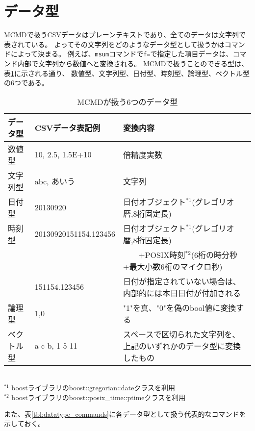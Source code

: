 
%

\section{データ型\label{sect:datatype}}
MCMDで扱うCSVデータはプレーンテキストであり、全てのデータは文字列で表されている。
よってその文字列をどのようなデータ型として扱うかはコマンドによって決まる。
例えば、\verb|msum|コマンドで\verb|f=|で指定した項目データは、コマンド内部で文字列から数値へと変換される。
MCMDで扱うことのできる型は、表\ref{tbl:datatype_types}に示される通り、
数値型、文字列型、日付型、時刻型、論理型、ベクトル型の6つである。

\begin{table}[!hb]
\begin{center}
\caption{MCMDが扱う6つのデータ型\label{tbl:datatype_types}}
{\small
  \begin{tabular}{l|l|l} \hline
データ型  & CSVデータ表記例        & 変換内容 \\ \hline
数値型    & 10, 2.5, 1.5E+10       & 倍精度実数 \\
文字列型  & abc, あいう            & 文字列 \\
日付型    & 20130920               & 日付オブジェクト$^{*1}$(グレゴリオ暦,8桁固定長) \\
時刻型    & 20130920151154.123456  & 日付オブジェクト$^{*1}$(グレゴリオ暦,8桁固定長) \\
          &                        & \ \ \ \ +POSIX時刻$^{*2}$(6桁の時分秒+最大小数6桁のマイクロ秒) \\
          & 151154.123456          & 日付が指定されていない場合は、内部的には本日日付が付加される \\
論理型    & 1,0                    & "1"を真、"0"を偽のbool値に変換する \\
ベクトル型& a c b, 1 5 11          & スペースで区切られた文字列を、上記のいずれかのデータ型に変換したもの \\
\hline
  \end{tabular}
\\
$^{*1}$ boostライブラリのboost::gregorian::dateクラスを利用 \\
$^{*2}$ boostライブラリのboost::posix\_time::ptimeクラスを利用 \\
  }
  \end{center}
\end{table}

また、表\ref{tbl:datatype_commands}に各データ型として扱う代表的なコマンドを示しておく。

